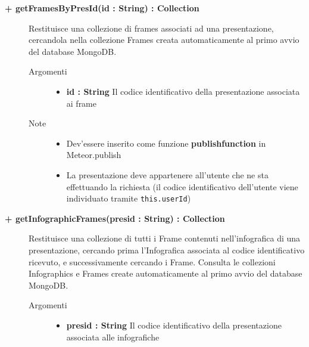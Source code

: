 \begin{description}
	\begin{description}
		\item[\textbf{\color{blue}+ getFramesByPresId(id : String) : Collection			}] \hfill
			Restituisce una collezione di frames associati ad una presentazione, cercandola nella collezione Frames creata automaticamente al primo avvio del database MongoDB.
			
		\begin{description}
			\item[Argomenti] \hfill
				\begin{itemize}
				
					\item \textbf{id : String			} \hfill
					Il codice identificativo della presentazione associata ai frame
					
				\end{itemize}
			\item[Note] \hfill
			\begin{itemize}
					\item Dev'essere inserito come funzione \textbf{publishfunction} in Meteor.publish
					\item La presentazione deve appartenere all'utente che ne sta effettuando la richiesta (il codice identificativo dell'utente viene individuato tramite \texttt{this.userId})
				\end{itemize}
		\end{description}
	\end{description}
	
	\begin{description}
		\item[\textbf{\color{blue}+ getInfographicFrames(presid : String) : Collection			}] \hfill
			Restituisce una collezione di tutti i Frame contenuti nell'infografica di una presentazione, cercando prima l'Infografica associata al codice identificativo ricevuto, e successivamente cercando i Frame. Consulta le collezioni Infographics e Frames create automaticamente al primo avvio del database MongoDB.
			
		\begin{description}
			\item[Argomenti] \hfill
				\begin{itemize}
				
					\item \textbf{presid : String			} \hfill
					Il codice identificativo della presentazione associata alle infografiche
					

\end{itemize}
\end{description}
\end{description}
\end{description}
